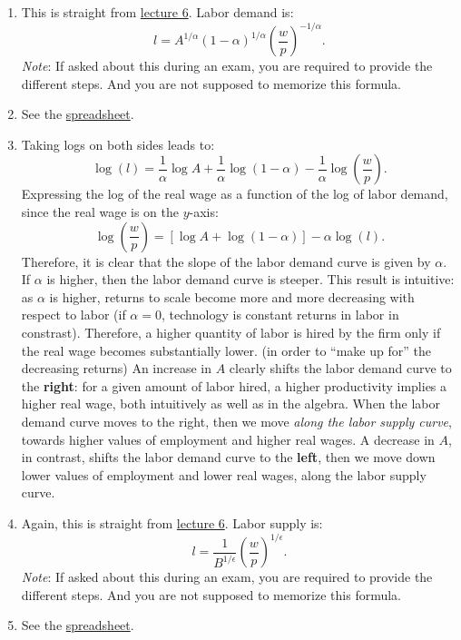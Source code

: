 \documentclass[]{book}
\theoremstyle{definition}
\theoremstyle{definition}
\theoremstyle{definition}
\theoremstyle{remark}
\begin{document}
\begin{enumerate}
\def\labelenumi{\arabic{enumi}.}
\item
  This is straight from \protect\hyperlink{labor-market}{lecture 6}.
  Labor demand is:
  \[l=A^{1/\alpha}(1-\alpha)^{1/\alpha}\left(\frac{w}{p}\right)^{-1/\alpha}.\]
  \emph{Note}: If asked about this during an exam, you are required to
  provide the different steps. And you are not supposed to memorize this
  formula.
\item
  See the
  \href{https://docs.google.com/spreadsheets/d/1h9JJD8K2_IE166gdj78waf0zu4YDY9Rp3r5oiJR_06s/edit?usp=sharing}{spreadsheet}.
\item
  Taking logs on both sides leads to:
  \[\log(l)=\frac{1}{\alpha}\log A+\frac{1}{\alpha}\log(1-\alpha)-\frac{1}{\alpha}\log\left(\frac{w}{p}\right).\]
  Expressing the log of the real wage as a function of the log of labor
  demand, since the real wage is on the \(y\)-axis:
  \[\boxed{\log\left(\frac{w}{p}\right) = \left[\log A + \log(1-\alpha)\right] -\alpha \log(l)}.\]
  Therefore, it is clear that the slope of the labor demand curve is
  given by \(\alpha\). If \(\alpha\) is higher, then the labor demand
  curve is steeper. This result is intuitive: as \(\alpha\) is higher,
  returns to scale become more and more decreasing with respect to labor
  (if \(\alpha=0\), technology is constant returns in labor in
  constrast). Therefore, a higher quantity of labor is hired by the firm
  only if the real wage becomes substantially lower. (in order to ``make
  up for'' the decreasing returns) An increase in \(A\) clearly shifts
  the labor demand curve to the \textbf{right}: for a given amount of
  labor hired, a higher productivity implies a higher real wage, both
  intuitively as well as in the algebra. When the labor demand curve
  moves to the right, then we move \emph{along the labor supply curve},
  towards higher values of employment and higher real wages. A decrease
  in \(A\), in contrast, shifts the labor demand curve to the
  \textbf{left}, then we move down lower values of employment and lower
  real wages, along the labor supply curve.
\item
  Again, this is straight from \protect\hyperlink{labor-market}{lecture
  6}. Labor supply is:
  \[l=\frac{1}{B^{1/\epsilon}}\left(\frac{w}{p}\right)^{1/\epsilon}.\]
  \emph{Note}: If asked about this during an exam, you are required to
  provide the different steps. And you are not supposed to memorize this
  formula.
\item
  See the
  \href{https://docs.google.com/spreadsheets/d/1h9JJD8K2_IE166gdj78waf0zu4YDY9Rp3r5oiJR_06s/edit?usp=sharing}{spreadsheet}.

\end{enumerate}
\end{document}
